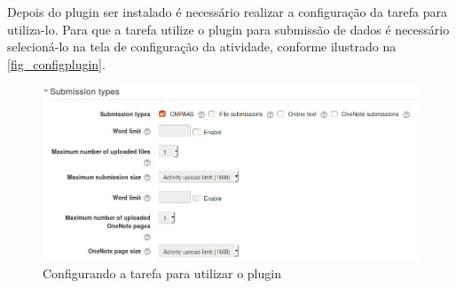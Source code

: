 \documentclass[
	12pt,				%
	openright,			%
	oneside,			%
	a4paper,			%
	english,			%
	french,				%
	spanish,			%
	brazil				%
	]{abntex2}
\begin{document}
Depois do plugin ser instalado é necessário realizar a configuração da tarefa para utiliza-lo. Para que a tarefa utilize o plugin para submissão de dados é necessário selecioná-lo na tela de configuração da atividade, conforme ilustrado na \autoref{fig_configplugin}.

\begin{figure}[htb]
	\caption{\label{fig_configplugin} Configurando a tarefa para utilizar o plugin}
	\begin{center}
		\includegraphics[scale=0.4]{configplugin.png}
	\end{center}
\end{figure}
\end{document}
